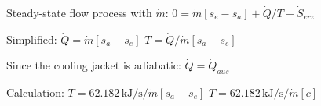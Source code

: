 Steady-state flow process with \( \dot{m} \):  
\( 0 = \dot{m} [s_e - s_a] + \dot{Q} / T + \dot{S}_{erz} \)  

Simplified:  
\( \dot{Q} = \dot{m} [s_a - s_e] \)  
\( T = \dot{Q} / \dot{m} [s_a - s_e] \)  

Since the cooling jacket is adiabatic:  
\( \dot{Q} = \dot{Q}_{aus} \)  

Calculation:  
\( T = 62.182 \, \text{kJ/s} / \dot{m} [s_a - s_e] \)  
\( T = 62.182 \, \text{kJ/s} / \dot{m} [c] \)